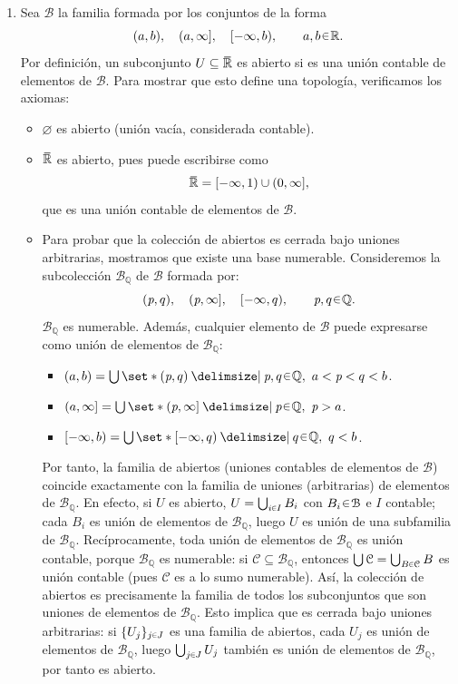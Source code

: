 \begin{sol}
\begin{enumerate}[label = (\roman*)]
\item %
Sea $\mathcal{B}$ la familia formada por los conjuntos de la forma
\[
(a,b),\quad (a,\infty],\quad [-\infty,b),\qquad a,b\en\mathbb{R}.
\]
Por definición, un subconjunto $U\subseteq\ubar{\mathbb{R}}$ es abierto si es una unión contable de elementos de $\mathcal{B}$. Para mostrar que esto define una topología, verificamos los axiomas:
\begin{itemize}
    \item $\varnothing$ es abierto (unión vacía, considerada contable).

    \item $\ubar{\mathbb{R}}$ es abierto, pues puede escribirse como
    \[
    \ubar{\mathbb{R}} = [-\infty,1) \cup (0,\infty],
    \]
    que es una unión contable de elementos de $\mathcal{B}$.

    \item Para probar que la colección de abiertos es cerrada bajo uniones arbitrarias, mostramos que existe una base numerable. Consideremos la subcolección $\mathcal{B}_{\mathbb{Q}}$ de $\mathcal{B}$ formada por:
    \[
    (\p,q),\quad (\p,\infty],\quad [-\infty,q),\qquad \p,q\en\mathbb{Q}.
    \]
    $\mathcal{B}_{\mathbb{Q}}$ es numerable. Además, cualquier elemento de $\mathcal{B}$ puede expresarse como unión de elementos de $\mathcal{B}_{\mathbb{Q}}$:
    \begin{itemize}
        \item $(a,b) = \bigcup\set*{(\p,q) \given \p,q\en\mathbb{Q},\ a<\p<q<b}$.
        \item $(a,\infty] = \bigcup\set*{(\p,\infty] \given \p\en\mathbb{Q},\ \p>a}$.
        \item $[-\infty,b) = \bigcup\set*{[-\infty,q) \given q\en\mathbb{Q},\ q<b}$.
    \end{itemize}
    Por tanto, la familia de abiertos (uniones contables de elementos de $\mathcal{B}$) coincide exactamente con la familia de uniones (arbitrarias) de elementos de $\mathcal{B}_{\mathbb{Q}}$. En efecto, si $U$ es abierto, $U = \bigcup_{i\en I} B_i$ con $B_i\en\mathcal{B}$ e $I$ contable; cada $B_i$ es unión de elementos de $\mathcal{B}_{\mathbb{Q}}$, luego $U$ es unión de una subfamilia de $\mathcal{B}_{\mathbb{Q}}$. Recíprocamente, toda unión de elementos de $\mathcal{B}_{\mathbb{Q}}$ es unión contable, porque $\mathcal{B}_{\mathbb{Q}}$ es numerable: si $\mathcal{C}\subseteq\mathcal{B}_{\mathbb{Q}}$, entonces $\bigcup\mathcal{C} = \bigcup_{B\en\mathcal{C}} B$ es unión contable (pues $\mathcal{C}$ es a lo sumo numerable). Así, la colección de abiertos es precisamente la familia de todos los subconjuntos que son uniones de elementos de $\mathcal{B}_{\mathbb{Q}}$. Esto implica que es cerrada bajo uniones arbitrarias: si $\{U_j\}_{j\en J}$ es una familia de abiertos, cada $U_j$ es unión de elementos de $\mathcal{B}_{\mathbb{Q}}$, luego $\bigcup_{j\en J} U_j$ también es unión de elementos de $\mathcal{B}_{\mathbb{Q}}$, por tanto es abierto.


\end{itemize}
\end{enumerate}
\end{sol}
